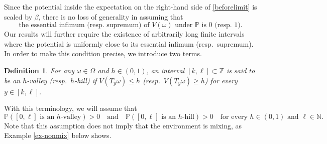 \documentclass[a4paper]{amsart}
\numberwithin{equation}{section}
\theoremstyle{plain}
\newtheorem{definition}[theorem]{\sc Definition}
\theoremstyle{remark}
\begin{document}
Since the potential inside the expectation on the right-hand side of \eqref{beforelimit} is scaled by $\beta$, there is no loss of generality in assuming that
\begin{equation}\label{ass_wlog}
\text{the essential infimum (resp.\ supremum) of $V(\omega)$ under $\mathbb{P}$ is $0$ (resp.\ $1$).}
\end{equation}
Our results will further require the existence of arbitrarily long finite intervals where the potential is uniformly close to its essential infimum (resp.\ supremum). In order to make this condition precise, we introduce two terms.
\begin{definition}\label{pandef}
	For any $\omega\in\Omega$ and $h\in(0,1)$, an interval $[k,\ell]\subset\mathbb{Z}$ is said to be an $h$-valley (resp.\ $h$-hill) if $V(T_y\omega) \le h$ (resp.\ $V(T_y\omega) \ge h$) for every $y\in[k,\ell]$.
\end{definition}
With this terminology, we will assume that
\begin{equation}\label{ass_pan}
\mathbb{P}(\text{$[0,\ell]$ is an $h$-valley}) > 0\quad\text{and}\quad\mathbb{P}(\text{$[0,\ell]$ is an $h$-hill}) > 0\quad\text{for every $h\in(0,1)$ and $\ell\in\mathbb{N}$.}
\end{equation}
Note that this assumption does not imply {}{that the environment 
is mixing},
{}{as Example \ref{ex-nonmix} below shows.}
\end{document}
